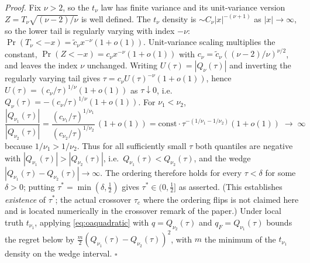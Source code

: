 \documentclass[11pt]{article}
\begin{document}
\noindent\emph{Proof.} Fix $\nu>2$, so the $t_\nu$ law has finite variance and its
unit-variance version $Z=T_\nu\sqrt{(\nu-2)/\nu}$ is well defined. The
$t_\nu$ density is $\sim C_\nu|x|^{-(\nu+1)}$ as $|x|\to\infty$, so the
lower tail is regularly varying with index $-\nu$: $\Pr(T_\nu<-x)=
\tilde c_\nu x^{-\nu}(1+o(1))$. Unit-variance scaling multiplies the
constant, $\Pr(Z<-x)=c_\nu x^{-\nu}(1+o(1))$ with
$c_\nu=\tilde c_\nu((\nu-2)/\nu)^{\nu/2}$, and leaves the index $\nu$
unchanged. Writing $U(\tau)=|Q_\nu(\tau)|$ and inverting the regularly
varying tail \citep{embrechts1997} gives $\tau=c_\nu U(\tau)^{-\nu}
(1+o(1))$, hence $U(\tau)=(c_\nu/\tau)^{1/\nu}(1+o(1))$ as
$\tau\downarrow0$, i.e.\ $Q_\nu(\tau)=-(c_\nu/\tau)^{1/\nu}(1+o(1))$.
For $\nu_1<\nu_2$,
\[
\frac{|Q_{\nu_1}(\tau)|}{|Q_{\nu_2}(\tau)|}
=\frac{(c_{\nu_1}/\tau)^{1/\nu_1}}{(c_{\nu_2}/\tau)^{1/\nu_2}}\,(1+o(1))
=\text{const}\cdot\tau^{-(1/\nu_1-1/\nu_2)}(1+o(1))\;\longrightarrow\;\infty
\]
because $1/\nu_1>1/\nu_2$. Thus for all sufficiently small $\tau$ both
quantiles are negative with $|Q_{\nu_1}(\tau)|>|Q_{\nu_2}(\tau)|$, i.e.\
$Q_{\nu_1}(\tau)<Q_{\nu_2}(\tau)$, and the wedge
$|Q_{\nu_1}(\tau)-Q_{\nu_2}(\tau)|\to\infty$. The ordering therefore
holds for every $\tau<\delta$ for some $\delta>0$; putting
$\tau^*=\min(\delta,\tfrac12)$ gives $\tau^*\in(0,\tfrac12]$ as
asserted. (This establishes \emph{existence} of $\tau^*$; the actual
crossover $\tau_c$ where the ordering flips is not claimed here and is
located numerically in the crossover remark of the paper.) Under local truth
$t_{\nu_1}$, applying \eqref{eq:oaquadratic} with $q=Q_{\nu_2}(\tau)$ and
$q_F=Q_{\nu_1}(\tau)$ bounds the regret below by
$\tfrac{m}{2}(Q_{\nu_1}(\tau)-Q_{\nu_2}(\tau))^2$, with $m$ the minimum
of the $t_{\nu_1}$ density on the wedge interval. \hfill$\square$
\end{document}
